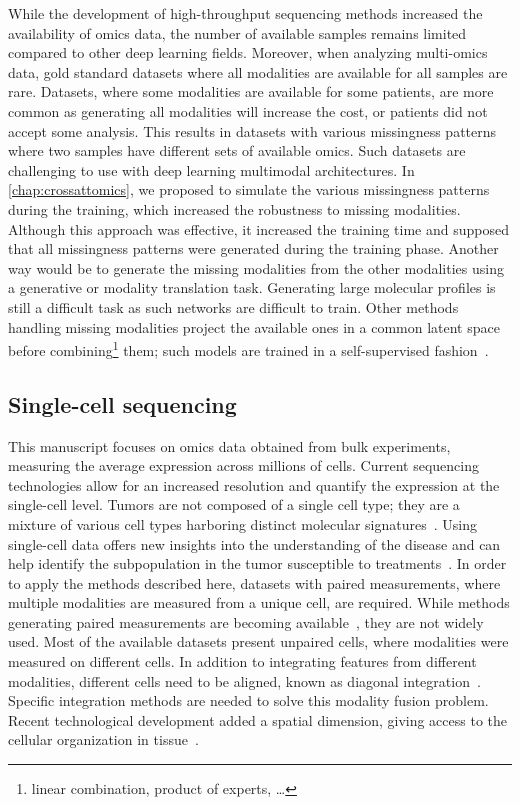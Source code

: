 \documentclass[../main.tex]{subfiles}
\begin{document}
		While the development of high-throughput sequencing methods increased the availability of omics data, the number of available samples remains limited compared to other deep learning fields.
		Moreover, when analyzing multi-omics data, gold standard datasets where all modalities are available for all samples are rare.
		Datasets, where some modalities are available for some patients, are more common as generating all modalities will increase the cost, or patients did not accept some analysis.
		This results in datasets with various missingness patterns where two samples have different sets of available omics.
		Such datasets are challenging to use with deep learning multimodal architectures.
		In \cref{chap:crossattomics}, we proposed to simulate the various missingness patterns during the training, which increased the robustness to missing modalities.
		Although this approach was effective, it increased the training time and supposed that all missingness patterns were generated during the training phase.
		Another way would be to generate the missing modalities from the other modalities using a generative or modality translation task.
		Generating large molecular profiles is still a difficult task as such networks are difficult to train.
		Other methods handling missing modalities project the available ones in a common latent space before combining\footnote{linear combination, product of experts, \dots} them; such models are trained in a self-supervised fashion~\cite{Lee2021AVI}.

	\subsection{Single-cell sequencing}
		This manuscript focuses on omics data obtained from bulk experiments, measuring the average expression across millions of cells.
		Current sequencing technologies allow for an increased resolution and quantify the expression at the single-cell level.
		Tumors are not composed of a single cell type; they are a mixture of various cell types harboring distinct molecular signatures~\cite{TumourHetero}.
		Using single-cell data offers new insights into the understanding of the disease and can help identify the subpopulation in the tumor susceptible to treatments~\cite{DagogoJack2017}.
		In order to apply the methods described here, datasets with paired measurements, where multiple modalities are measured from a unique cell, are required.
		While methods generating paired measurements are becoming available~\cite{Macaulay2015,Hao2021,Vandereyken2023}, they are not widely used.
		Most of the available datasets present unpaired cells, where modalities were measured on different cells.
		In addition to integrating features from different modalities, different cells need to be aligned, known as diagonal integration~\cite{Xu2022}.
		Specific integration methods are needed to solve this modality fusion problem.
		Recent technological development added a spatial dimension, giving access to the cellular organization in tissue~\cite{Vandereyken2023}.
\end{document}
